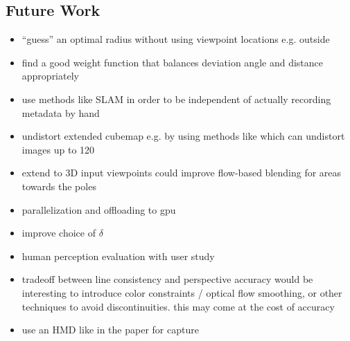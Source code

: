 \subsection{Future Work}
\begin{itemize}
  \item ``guess'' an optimal radius without using viewpoint locations e.g. outside
  \item find a good weight function that balances deviation angle and distance appropriately
  \item use methods like SLAM in order to be independent of actually recording metadata by hand
  \item undistort extended cubemap e.g. by using methods like \cite{fov} which can undistort images up to 120\degree
  \item extend to 3D \ar input viewpoints could improve flow-based blending for areas towards the poles
  \item parallelization and offloading to gpu
  \item improve choice of $\delta$
  \item human perception evaluation with user study
  \item tradeoff between line consistency and perspective accuracy \ar would be interesting to introduce color constraints / optical flow smoothing, or other techniques to avoid discontinuities. this may come at the cost of accuracy
  \item use an HMD like in the paper for capture
\end{itemize}

